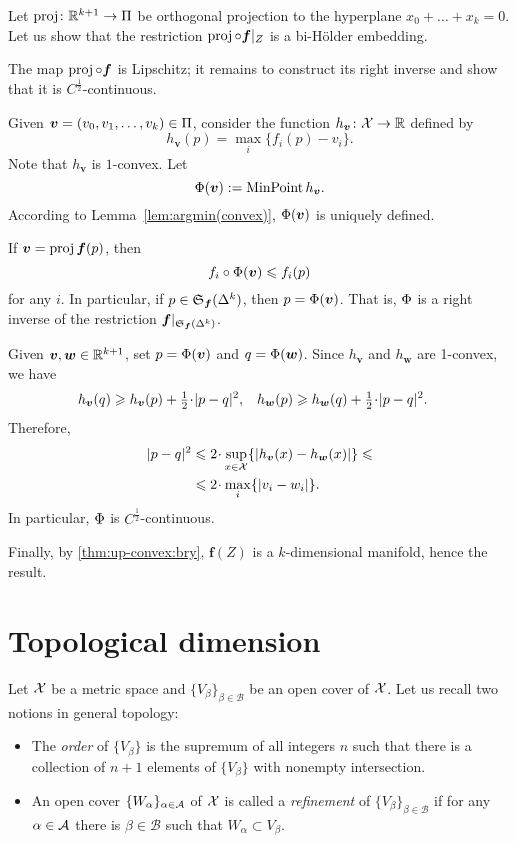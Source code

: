 Let $\operatorname{\rm proj}\nolimits\colon\mathbb{R}^{k+1}\to\Pi$ be orthogonal projection to the hyperplane $x_0+\dots+x_k=0$.
Let us show that the restriction $\operatorname{\rm proj}\nolimits\circ \bm{f}|_Z$ is a bi-H\"older embedding.

The map $\operatorname{\rm proj}\nolimits\circ \bm{f}$ is Lipschitz;
it remains to construct its right inverse and show that it is $C^{\frac12}$-continuous.

Given $\bm{v}=(v_0,v_1,\dots,v_k)\in\Pi$, consider the function 
$h_{\bm{v}}\colon \mathcal{X}\to \mathbb{R}$ defined by
\[h_{\bm{v}}(p)=\max_i\{f_i(p)-v_i\}.\]
Note that $h_{\bm{v}}$ is $1$-convex.
Let 
$$\Phi(\bm{v})\mathrel{:=}\mathop{\rm MinPoint} h_{\bm{v}}.$$
According to Lemma~\ref{lem:argmin(convex)}, $\Phi(\bm{v})$ is uniquely defined.

If $\bm{v}=\operatorname{\rm proj}\nolimits \bm{f}(p)$, then 
\[f_i\circ \Phi(\bm{v})\leqslant f_i(p)\]
for any $i$.
In particular, if $p\in \mathfrak{S}_{\bm{f}}(\Delta^k)$, then  $p=\Phi(\bm{v})$.
That is, $\Phi$ is a right inverse of the restriction $\bm{f}|_{\mathfrak{S}_{\bm{f}}(\Delta^k)}$.

Given $\bm{v},\bm{w}\in\mathbb{R}^{k+1}$,
set $p=\Phi (\bm{v})$ and $q=\Phi (\bm{w})$.
Since $h_{\bm{v}}$ and $h_{\bm{w}}$ are 1-convex, we have
\begin{align*}
h_{\bm{v}}(q)
&\ge 
h_{\bm{v}}(p)+\tfrac{1}{2}\cdot\dist[2]{p}{q}{},
&
h_{\bm{w}}(p)
&\ge 
h_{\bm{w}}(q)+\tfrac{1}{2}\cdot\dist[2]{p}{q}{}.
\end{align*}
Therefore,
\begin{align*}
\dist[2]{p}{q}{}
&\le 
2\cdot\sup_{x\in\spc{X}}\{ |h_{\bm{v}}(x)-h_{\bm{w}}(x)| \}
\le
\\
&\le 
2\cdot\max_{i}\{|v_i-w_i|\}.
\end{align*}
In particular,
$\Phi$ is $C^{\frac{1}{2}}$-continuous.

Finally, by \ref{thm:up-convex:bry}, $\bm{f}(Z)$ is a $k$-dimensional manifold, hence the result.
\qeds

\section{Topological dimension}

Let $\mathcal{X}$ be a metric space and $\{V_\beta\}_{\beta\in\mathcal{B}}$
 be an open cover of $\mathcal{X}$.
Let us recall two notions in general topology:
\begin{itemize}

\item The \emph{order} of $\{V_\beta\}$ is the supremum of all integers $n$ such that there is a collection of $n+1$ elements of $\{V_\beta\}$ with nonempty intersection.

\item An open cover $\{W_\alpha\}_{\alpha\in\mathcal{A}}$ of $\mathcal{X}$ is called a \emph{refinement} of  $\{V_\beta\}_{\beta\in\mathcal{B}}$ if for any $\alpha\in\mathcal{A}$ there is $\beta\in\mathcal{B}$ such that $W_\alpha\subset V_\beta$.

\end{itemize}

